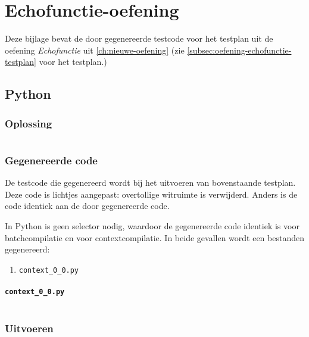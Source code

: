 \chapter{Echofunctie-oefening}\label{ch:echo-function-oefening}

Deze bijlage bevat de door \tested{} gegenereerde testcode voor het testplan uit de oefening \emph{Echofunctie} uit \cref{ch:nieuwe-oefening} (zie \cref{subsec:oefening-echofunctie-testplan} voor het testplan.)

\section{Python}\label{sec:echo-function-python}

\subsection{Oplossing}\label{subsec:echo-function-python-oplossing}

\inputminted{python}{sources/echo-function/correct.py}

\subsection{Gegenereerde code}\label{subsec:echo-function-python-gegenereerde-code}

De testcode die gegenereerd wordt bij het uitvoeren van bovenstaande testplan.
Deze code is lichtjes aangepast: overtollige witruimte is verwijderd.
Anders is de code identiek aan de door \tested{} gegenereerde code.

In Python is geen selector nodig, waardoor de gegenereerde code identiek is voor batchcompilatie en voor contextcompilatie.
In beide gevallen wordt een bestanden gegenereerd:

\begin{enumerate}
    \item \texttt{context\_0\_0.py}
\end{enumerate}

\subsubsection{\texttt{context\_0\_0.py}}

\inputminted{python}{sources/echo-function/context_0_0.py}

\subsection{Uitvoeren}\label{subsec:echo-function-python-uitvoeren}

